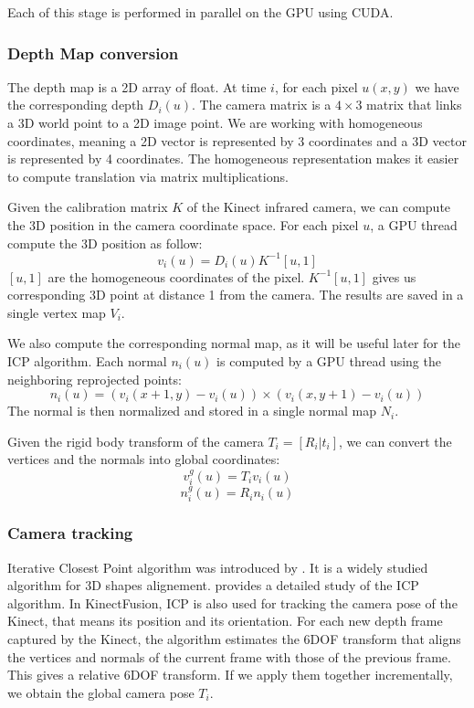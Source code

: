\documentclass[12pt]{article}
\begin{document}
Each of this stage is performed in parallel on the GPU using CUDA.

\subsubsection{Depth Map conversion}
The depth map is a 2D array of float. At time $i$, for each pixel $u(x,y)$ we have the corresponding depth $D_i(u)$. The camera matrix is a $4\times 3$ matrix that links a 3D world point to a 2D image point. We are working with homogeneous coordinates, meaning a 2D vector is represented by 3 coordinates and a 3D vector is represented by 4 coordinates. The homogeneous representation makes it easier to compute translation via matrix multiplications.

Given the calibration matrix $K$ of the Kinect infrared camera, we can compute the 3D position in the camera coordinate space. For each pixel $u$, a GPU thread compute the 3D position as follow:
$$v_i(u) = D_i(u)K^{-1}[u,1]$$
$[u,1]$ are the homogeneous coordinates of the pixel. $K^{-1}[u,1]$ gives us corresponding 3D point at distance 1 from the camera. The results are saved in a single vertex map $V_i$.

We also compute the corresponding normal map, as it will be useful later for the ICP algorithm. Each normal $n_i(u)$ is computed by a GPU thread using the neighboring reprojected points:
$$n_i(u) = (v_i(x+1,y) - v_i(u))\times (v_i(x,y+1) - v_i(u))$$
The normal is then normalized and stored in a single normal map $N_i$.

Given the rigid body transform of the camera $T_i = [R_i|t_i]$, we can convert the vertices and the normals into global coordinates:
$$v_i^g(u) = T_iv_i(u)$$
$$n_i^g(u) = R_in_i(u)$$

\subsubsection{Camera tracking}
Iterative Closest Point algorithm was introduced by \cite{ICP1}. It is a widely studied algorithm for 3D shapes alignement. \cite{ICP2} provides a detailed study of the ICP algorithm. In KinectFusion, ICP is also used for tracking the camera pose of the Kinect, that means its position and its orientation. For each new depth frame captured by the Kinect, the algorithm estimates the 6DOF transform that aligns the vertices and normals of the current frame with those of the previous frame. This gives a relative 6DOF transform. If we apply them together incrementally, we obtain the global camera pose $T_i$.
\end{document}
